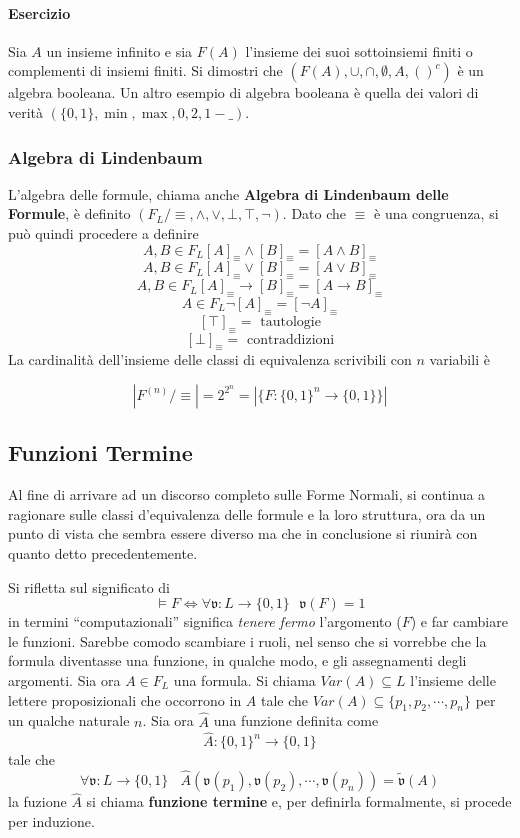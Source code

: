\paragraph{Esercizio} 
Sia $A$ un insieme infinito e sia $F(A)$
l'insieme dei suoi sottoinsiemi finiti o complementi di insiemi 
finiti. Si dimostri che $(F(A), \cup, \cap, \emptyset, A, ()^c)$ è un algebra booleana. 
Un altro esempio di algebra 
booleana è quella dei valori di verità $(\{0,1\}, \min, \max, 0, 2, 1-\_)$. 

\subsubsection{Algebra di Lindenbaum}
L'algebra delle formule, chiama anche \textbf{Algebra di 
Lindenbaum delle Formule}, è definito $(F_L/\equiv, \land, \lor, \bot, \top, \neg)$. 
Dato che $\equiv$ è una congruenza, si può quindi procedere a definire
$$
A,B \in F_L [A]_{\equiv} \land [B]_{\equiv} = [A \land B]_{\equiv}
$$
$$
A,B \in F_L [A]_{\equiv} \lor [B]_{\equiv} = [A \lor B]_{\equiv}
$$
$$
A,B \in F_L [A]_{\equiv} \rightarrow [B]_{\equiv} = [A \rightarrow B]_{\equiv}
$$
$$
A \in F_L \neg [A]_{\equiv} = [\neg A]_{\equiv}
$$
$$
[\top]_{\equiv} = \text{ tautologie}
$$
$$
[\bot]_{\equiv} = \text{ contraddizioni}
$$
La cardinalità dell'insieme delle classi di equivalenza scrivibili con $n$
variabili è 

$$
|F^{(n)}/\equiv| = 2 ^ {2^n} = |\{F: \{0,1\}^n \rightarrow \{0,1\}\}|
$$

\subsection{Funzioni Termine}
Al fine di arrivare ad un discorso completo sulle Forme Normali, 
si continua a ragionare sulle classi d'equivalenza delle formule e la 
loro struttura, ora da un punto di vista che sembra essere diverso 
ma che in conclusione si riunirà con quanto detto precedentemente. 

Si rifletta sul significato di 
$$
\models F \iff \forall \mathfrak{v}: L \rightarrow \{0,1\} ~~~  \mathfrak{v}(F) = 1
$$
in termini ``computazionali'' significa \textit{tenere fermo} l'argomento 
($F$) e far cambiare le funzioni. Sarebbe comodo scambiare i ruoli, nel 
senso che si vorrebbe che la formula diventasse una funzione, in qualche modo,
e gli assegnamenti degli argomenti. 
Sia ora $A \in F_L$ una formula. Si chiama $Var(A) \subseteq L$ l'insieme delle lettere 
proposizionali che occorrono in $A$ tale che 
$Var(A) \subseteq \{p_1, p_2, \cdots, p_n\}$ per un qualche naturale $n$.  
Sia ora $\hat{A}$ una funzione definita come 
$$
\hat{A} : \{0,1\}^n \rightarrow \{0,1\}
$$
tale che 
$$
\forall \mathfrak{v}:L \rightarrow \{0,1\} ~~~~ \hat{A}(\mathfrak{v}(p_1), \mathfrak{v}(p_2), \cdots, \mathfrak{v}(p_n)) = \tilde{\mathfrak{v}}(A)
$$
la fuzione $\hat{A}$ si chiama \textbf{funzione termine} e, per definirla formalmente, 
si procede per induzione. 
